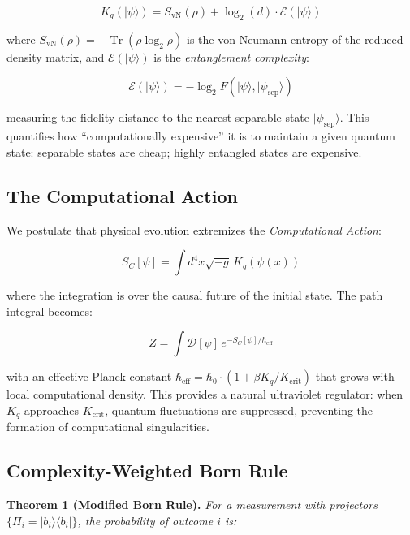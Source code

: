 \documentclass[12pt,a4paper]{article}
\newcommand{\ket}[1]{|#1\rangle}
\newcommand{\bra}[1]{\langle#1|}
\DeclareMathOperator{\Tr}{Tr}
\begin{document}
\begin{equation}
K_q(\ket{\psi}) = S_{\text{vN}}(\rho) + \log_2(d) \cdot \mathcal{E}(\ket{\psi})
\label{eq:Kq}
\end{equation}

where $S_{\text{vN}}(\rho) = -\Tr(\rho \log_2 \rho)$ is the von Neumann entropy of the reduced density matrix, and $\mathcal{E}(\ket{\psi})$ is the \textit{entanglement complexity}:

\begin{equation}
\mathcal{E}(\ket{\psi}) = -\log_2 F(\ket{\psi}, \ket{\psi_{\text{sep}}})
\end{equation}

measuring the fidelity distance to the nearest separable state $\ket{\psi_{\text{sep}}}$. This quantifies how ``computationally expensive'' it is to maintain a given quantum state: separable states are cheap; highly entangled states are expensive.

\subsection{The Computational Action}

We postulate that physical evolution extremizes the \textit{Computational Action}:

\begin{equation}
S_C[\psi] = \int d^4x \sqrt{-g} \, K_q(\psi(x))
\label{eq:action}
\end{equation}

where the integration is over the causal future of the initial state. The path integral becomes:

\begin{equation}
Z = \int \mathcal{D}[\psi] \, e^{-S_C[\psi] / \hbar_{\text{eff}}}
\end{equation}

with an effective Planck constant $\hbar_{\text{eff}} = \hbar_0 \cdot (1 + \beta K_q / K_{\text{crit}})$ that grows with local computational density. This provides a natural ultraviolet regulator: when $K_q$ approaches $K_{\text{crit}}$, quantum fluctuations are suppressed, preventing the formation of computational singularities.

\subsection{Complexity-Weighted Born Rule}

\textbf{Theorem 1 (Modified Born Rule).} \textit{For a measurement with projectors $\{\Pi_i = \ket{b_i}\bra{b_i}\}$, the probability of outcome $i$ is:}
\end{document}
